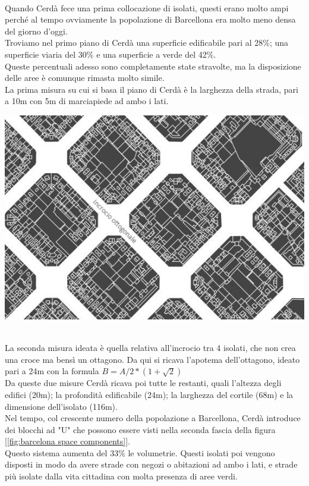 \documentclass[a4paper,12pt, oneside]{book}
\begin{document}
    \leavevmode\\
    Quando Cerdà fece una prima collocazione di isolati, questi erano molto ampi perché al tempo ovviamente la popolazione di Barcellona era molto meno densa del giorno d'oggi.\\
    Troviamo nel primo piano di Cerdà una superficie edificabile pari al 28\%; una superficie viaria del 30\% e una superficie a verde del 42\%.\\
    Queste percentuali adesso sono completamente state stravolte, ma la disposizione delle aree è comunque rimasta molto simile.\\
    La prima misura su cui si basa il piano di Cerdà è la larghezza della strada, pari a 10m con 5m di marciapiede ad ambo i lati.\\
    \begin{center}
    	\includegraphics[width=0.6\linewidth]{"immagini/incrocio ottogonale"}
    	\label{fig:incrocio ottogonale}
    \end{center}
    \leavevmode\\
    La seconda misura ideata è quella relativa all'incrocio tra 4 isolati, che non crea una croce ma bensì un ottagono. Da qui si ricava l'apotema dell'ottagono, ideato pari a 24m con la formula $B=A/2*(1+\sqrt{2})$\\
    Da queste due misure Cerdà ricava poi tutte le restanti, quali l'altezza degli edifici (20m); la profondità edificabile (24m); la larghezza del cortile (68m) e la dimensione dell'isolato (116m).\\
    Nel tempo, col crescente numero della popolazione a Barcellona, Cerdà introduce dei blocchi ad "U" che possono essere visti nella seconda fascia della figura [\ref{fig:barcelona space components}].\\
    Questo sistema aumenta del 33\% le volumetrie. Questi isolati poi vengono disposti in modo da avere strade con negozi o abitazioni ad ambo i lati, e strade più isolate dalla vita cittadina con molta presenza di aree verdi.\\
\end{document}
